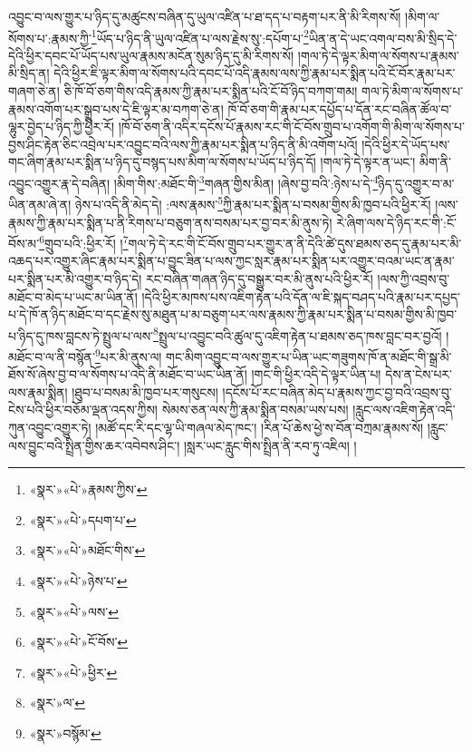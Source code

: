 འབྱུང་བ་ལས་གྱུར་པ་ཉིད་དུ་མཚུངས་བཞིན་དུ་ཡུལ་འཛིན་པ་ཐ་དད་པ་བརྟག་པར་ནི་མི་རིགས་སོ། །མིག་ལ་སོགས་པ་:རྣམས་ཀྱི་\footnote{«སྣར་»«པེ་»རྣམས་ཀྱིས་}ཡོད་པ་ཉིད་ནི་ཡུལ་འཛིན་པ་ལས་རྗེས་སུ་:དཔོག་པ་\footnote{«སྣར་»«པེ་»དཔག་པ་}ཡིན་ན་དེ་ཡང་འགལ་བས་མི་སྲིད་དེ་དེའི་ཕྱིར་དབང་པོ་ཡོད་པས་ཡུལ་རྣམས་མངོན་སུམ་ཉིད་དུ་མི་རིགས་སོ། །གལ་ཏེ་དེ་ལྟར་མིག་ལ་སོགས་པ་རྣམས་མི་སྲིད་ན། དེའི་ཕྱིར་ཇི་ལྟར་མིག་ལ་སོགས་པའི་དབང་པོ་འདི་རྣམས་ལས་ཀྱི་རྣམ་པར་སྨིན་པའི་ངོ་བོར་རྣམ་པར་གཞག་ཅེ་ན། ཅི་ཁོ་བོ་ཅག་གིས་འདི་རྣམས་ཀྱི་རྣམ་པར་སྨིན་པའི་ངོ་བོ་ཉིད་བཀག་གམ། གལ་ཏེ་མིག་ལ་སོགས་པ་རྣམས་འགོག་པར་སྒྲུབ་པས་དེ་ཇི་ལྟར་མ་བཀག་ཅེ་ན། ཁོ་བོ་ཅག་གི་རྣམ་པར་དཔྱོད་པ་དོན་རང་བཞིན་ཚོལ་བ་ལྷུར་བྱེད་པ་ཉིད་ཀྱི་ཕྱིར་རོ། །ཁོ་བོ་ཅག་ནི་འདིར་དངོས་པོ་རྣམས་རང་གི་ངོ་བོས་གྲུབ་པ་འགོག་གི་མིག་ལ་སོགས་པ་བྱས་ཤིང་རྟེན་ཅིང་འབྲེལ་པར་འབྱུང་བའི་ལས་ཀྱི་རྣམ་པར་སྨིན་པ་ཉིད་ནི་མི་འགོག་པའོ། །དེའི་ཕྱིར་དེ་ཡོད་པས་གང་ཞིག་རྣམ་པར་སྨིན་པ་ཉིད་དུ་བསྙད་པས་མིག་ལ་སོགས་པ་ཡོད་པ་ཉིད་དོ། །གལ་ཏེ་དེ་ལྟར་ན་ཡང་། མིག་ནི་འབྱུང་འགྱུར་རྣ་དེ་བཞིན། །མིག་གིས་:མཐོང་གི་\footnote{«སྣར་»«པེ་»མཐོང་གིས་}གཞན་གྱིས་མིན། །ཞེས་བྱ་བའི་:ཉེས་པ་དེ་\footnote{«སྣར་»«པེ་»ཉེས་པ་}ཉིད་དུ་འགྱུར་བ་མ་ཡིན་ནམ་ཞེ་ན། ཉེས་པ་འདི་ནི་མེད་དེ། :ལས་རྣམས་\footnote{«སྣར་»«པེ་»ལས་}ཀྱི་རྣམ་པར་སྨིན་པ་བསམ་གྱིས་མི་ཁྱབ་པའི་ཕྱིར་རོ། །ལས་རྣམས་ཀྱི་རྣམ་པར་སྨིན་པ་ནི་རིགས་པ་བཅུག་ནས་བསམ་པར་བྱ་བར་མི་ནུས་ཏེ། རེ་ཞིག་ལས་དེ་ཉིད་རང་གི་:ངོ་བོས་མ་\footnote{«སྣར་»«པེ་»ངོ་བོས་}གྲུབ་པའི་:ཕྱིར་རོ། །\footnote{«སྣར་»«པེ་»ཕྱིར་}གལ་ཏེ་དེ་རང་གི་ངོ་བོས་གྲུབ་པར་གྱུར་ན་ནི་དེའི་ཚེ་དུས་ཐམས་ཅད་དུ་རྣམ་པར་མི་འཆད་པར་འགྱུར་ཞིང་རྣམ་པར་སྨིན་པ་བྱུང་ཟིན་པ་ལས་ཀྱང་སླར་རྣམ་པར་སྨིན་པར་འགྱུར་བའམ་ཡང་ན་རྣམ་པར་སྨིན་པར་མི་འགྱུར་བ་ཉིད་དེ། རང་བཞིན་གཞན་ཉིད་དུ་བསྒྱུར་བར་མི་ནུས་པའི་ཕྱིར་རོ། །ལས་ཀྱི་འབྲས་བུ་མཐོང་བ་མེད་པ་ཡང་མ་ཡིན་ནོ། །དེའི་ཕྱིར་མཁས་པས་འཇིག་རྟེན་པའི་དོན་ལ་ཇི་སྐད་བཤད་པའི་རྣམ་པར་དཔྱད་པ་དེ་ཁོ་ན་ཉིད་མཐོང་བ་དང་རྗེས་སུ་མཐུན་པ་མ་བཅུག་པར་ལས་རྣམས་ཀྱི་རྣམ་པར་སྨིན་པ་བསམ་གྱིས་མི་ཁྱབ་པ་ཉིད་དུ་ཁས་བླངས་ཏེ་སྤྲུལ་པ་ལས་\footnote{«སྣར་»ལ་}སྤྲུལ་པ་འབྱུང་བའི་ཚུལ་དུ་འཇིག་རྟེན་པ་ཐམས་ཅད་ཁས་བླང་བར་བྱའོ། །མཐོང་བ་ལ་ནི་བསྙོན་\footnote{«སྣར་»བསྙོམ་}པར་མི་ནུས་ལ། གང་མིག་འབྱུང་བ་ལས་གྱུར་པ་ཡིན་ཡང་གཟུགས་ཁོ་ན་མཐོང་གི་སྒྲ་མི་ཐོས་སོ་ཞེས་བྱ་བ་ལ་སོགས་པ་འདི་ནི་མཐོང་བ་ཡང་ཡིན་ནོ། །གང་གི་ཕྱིར་འདི་དེ་ལྟར་ཡིན་པ། དེས་ན་ངེས་པར་ལས་རྣམ་སྨིན། །ཐུབ་པ་བསམ་མི་ཁྱབ་པར་གསུངས། །དངོས་པོ་རང་བཞིན་མེད་པ་རྣམས་ཀྱང་བྱ་བའི་འབྲས་བུ་ངེས་པའི་ཕྱིར་བཅོམ་ལྡན་འདས་ཀྱིས། སེམས་ཅན་ལས་ཀྱི་རྣམ་སྨིན་བསམ་ཡས་པས། །རླུང་ལས་འཇིག་རྟེན་འདི་ཀུན་འབྱུང་འགྱུར་ཏེ། །མཚོ་དང་རི་དང་ལྷ་ཡི་གཞལ་མེད་ཁང་། །རིན་པོ་ཆེས་ཕྱེ་ས་བོན་བཀྲམ་རྣམས་སོ། །རླུང་ལས་བྱུང་བའི་སྤྲིན་གྱིས་ཆར་འབེབས་ཤིང་། །སླར་ཡང་རླུང་གིས་སྤྲིན་ནི་རབ་ཏུ་འཇིལ། །
